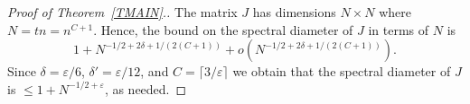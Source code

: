 \documentclass[11pt]{article}
\newcommand{\eps}{\varepsilon}
\begin{document}
\begin{proof}[Proof of Theorem~\ref{TMAIN}.]
The matrix $J$ has dimensions $N\times N$ where $N=tn = n^{C+1}$. Hence, the bound
on the spectral diameter of $J$ in terms of $N$ is 
$$
1 + N^{-1/2+2\delta+1/(2(C+1))} + o(N^{-1/2+2\delta+1/(2(C+1))}).
$$
Since $\delta=\eps/6$, $\delta'=\eps/12$, and $C=\lceil 3/\eps\rceil$ we obtain that the spectral diameter of $J$ is $\leq 1+N^{-1/2+\varepsilon}$, as needed.
\end{proof}




\newpage











\end{document}
